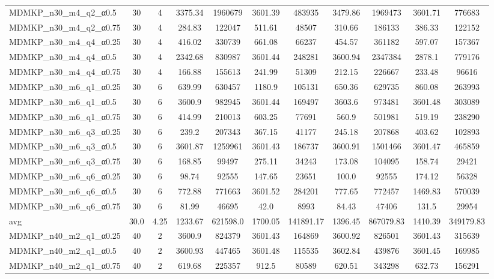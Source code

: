 \begin{table}[!ht]
\begin{tabular}{lcccccccccc}
MDMKP\_n30\_m4\_q2\_α0.5 & 30 & 4 & 3375.34 & 1960679 & 3601.39 & 483935 & 3479.86 & 1969473 & 3601.71 & 776683 \\
MDMKP\_n30\_m4\_q2\_α0.75 & 30 & 4 & 284.83 & 122047 & 511.61 & 48507 & 310.66 & 186133 & 386.33 & 122152 \\
MDMKP\_n30\_m4\_q4\_α0.25 & 30 & 4 & 416.02 & 330739 & 661.08 & 66237 & 454.57 & 361182 & 597.07 & 157367 \\
MDMKP\_n30\_m4\_q4\_α0.5 & 30 & 4 & 2342.68 & 830987 & 3601.44 & 248281 & 3600.94 & 2347384 & 2878.1 & 779176 \\
MDMKP\_n30\_m4\_q4\_α0.75 & 30 & 4 & 166.88 & 155613 & 241.99 & 51309 & 212.15 & 226667 & 233.48 & 96616 \\
MDMKP\_n30\_m6\_q1\_α0.25 & 30 & 6 & 639.99 & 630457 & 1180.9 & 105131 & 650.36 & 629735 & 860.08 & 263993 \\
MDMKP\_n30\_m6\_q1\_α0.5 & 30 & 6 & 3600.9 & 982945 & 3601.44 & 169497 & 3603.6 & 973481 & 3601.48 & 303089 \\
MDMKP\_n30\_m6\_q1\_α0.75 & 30 & 6 & 414.99 & 210013 & 603.25 & 77691 & 560.9 & 501981 & 519.19 & 238290 \\
MDMKP\_n30\_m6\_q3\_α0.25 & 30 & 6 & 239.2 & 207343 & 367.15 & 41177 & 245.18 & 207868 & 403.62 & 102893 \\
MDMKP\_n30\_m6\_q3\_α0.5 & 30 & 6 & 3601.87 & 1259961 & 3601.43 & 186737 & 3600.91 & 1501466 & 3601.47 & 465859 \\
MDMKP\_n30\_m6\_q3\_α0.75 & 30 & 6 & 168.85 & 99497 & 275.11 & 34243 & 173.08 & 104095 & 158.74 & 29421 \\
MDMKP\_n30\_m6\_q6\_α0.25 & 30 & 6 & 98.74 & 92555 & 147.65 & 23651 & 100.0 & 92555 & 174.12 & 56328 \\
MDMKP\_n30\_m6\_q6\_α0.5 & 30 & 6 & 772.88 & 771663 & 3601.52 & 284201 & 777.65 & 772457 & 1469.83 & 570039 \\
MDMKP\_n30\_m6\_q6\_α0.75 & 30 & 6 & 81.99 & 46695 & 42.0 & 8993 & 84.43 & 47406 & 131.5 & 29954 \\
\hline avg & 30.0 & 4.25 & 1233.67& 621598.0 & 1700.05& 141891.17 & 1396.45& 867079.83 & 1410.39& 349179.83\\ \hline
MDMKP\_n40\_m2\_q1\_α0.25 & 40 & 2 & 3600.9 & 824379 & 3601.43 & 164869 & 3600.92 & 826501 & 3601.43 & 315639 \\
MDMKP\_n40\_m2\_q1\_α0.5 & 40 & 2 & 3600.93 & 447465 & 3601.48 & 115535 & 3602.84 & 439876 & 3601.45 & 169985 \\
MDMKP\_n40\_m2\_q1\_α0.75 & 40 & 2 & 619.68 & 225357 & 912.5 & 80589 & 620.51 & 343298 & 632.73 & 156291 \\

\end{tabular}
\end{table}
